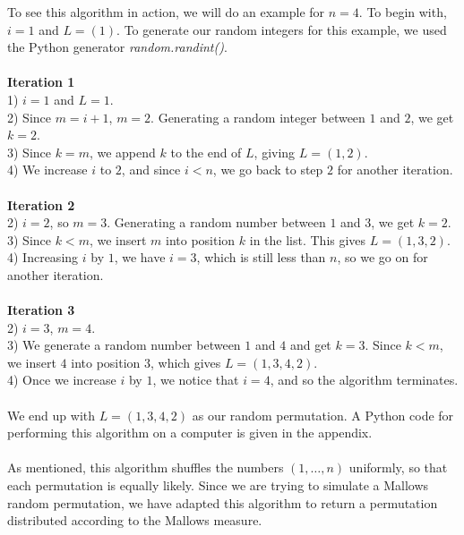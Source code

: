 \documentclass[12pt]{report}
\theoremstyle{definition}
\begin{document}
To see this algorithm in action, we will do an example for $n=4$.  
To begin with, $i=1$ and $L=(1)$.  To generate our random integers for this example, we used the Python generator {\em random.randint()}. \\
\\
{\bf Iteration 1} \\
1) $i=1$ and $L=1$.  \\
2) Since $m=i+1$, $m=2$.  Generating a random integer between $1$ and $2$, we get $k=2$. \\
3) Since $k=m$, we append $k$ to the end of $L$, giving $L=(1,2)$.   \\
4) We increase $i$ to $2$, and since $i<n$, we go back to step $2$ for another iteration. \\ \\
{\bf Iteration 2} \\
2) $i=2$, so $m=3$. Generating a random number between $1$ and $3$, we get $k=2$.  \\ 
3) Since $k<m$, we insert $m$ into position $k$ in the list.  This gives $L=(1,3,2)$. \\
4) Increasing $i$ by $1$, we have $i=3$, which is still less than $n$, so we go on for another iteration.
\\
\\
{\bf Iteration 3} \\
2) $i=3$, $m=4$. \\
3) We generate a random number between $1$ and $4$ and get $k=3$.  Since $k<m$, we insert $4$ into position $3$, which gives $L=(1,3,4,2)$.  \\
4) Once we increase $i$ by $1$, we notice that $i=4$, and so the algorithm terminates.
\\ 
\\
We end up with $L=(1,3,4,2)$ as our random permutation.  A Python code for performing this algorithm on a computer is given in the appendix.  
\\ \\
As mentioned, this algorithm shuffles the numbers $(1,\dots,n)$ uniformly, so that each permutation is equally likely.  Since we are trying to simulate a Mallows random permutation, we have adapted this algorithm to return a permutation distributed according to the Mallows measure.  
\newtheorem*{fy2}{Fisher Yates Algorithm for a Mallows Permutation}
\end{document}
